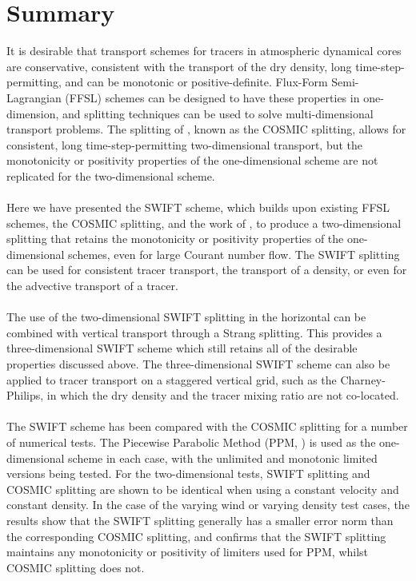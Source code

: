 \documentclass[11pt,a4paper]{article}
\begin{document}
\section{Summary}

It is desirable that transport schemes for tracers in atmospheric dynamical cores are conservative, consistent with the transport of the dry density, long time-step-permitting, and can be monotonic or positive-definite.
Flux-Form Semi-Lagrangian (FFSL) schemes can be designed to have these properties in one-dimension, and splitting techniques can be used to solve multi-dimensional transport problems.
The splitting of \cite{lin1996ffsl,leonard1996cosmic}, known as the COSMIC splitting, allows for consistent, long time-step-permitting two-dimensional transport, but the monotonicity or positivity properties of the one-dimensional scheme are not replicated for the two-dimensional scheme. \\
\\
Here we have presented the SWIFT scheme, which builds upon existing FFSL schemes, the COSMIC splitting, and the work of \cite{skamarock2006limiters}, to produce a two-dimensional splitting that retains the monotonicity or positivity properties of the one-dimensional schemes, even for large Courant number flow. The SWIFT splitting can be used for consistent tracer transport, the transport of a density, or even for the advective transport of a tracer.\\
\\
The use of the two-dimensional SWIFT splitting in the horizontal can be combined with vertical transport through a Strang splitting.
This provides a three-dimensional SWIFT scheme which still retains all of the desirable properties discussed above.
The three-dimensional SWIFT scheme can also be applied to tracer transport on a staggered vertical grid, such as the Charney-Philips, in which the dry density and the tracer mixing ratio are not co-located. \\
\\
The SWIFT scheme has been compared with the COSMIC splitting for a number of numerical tests.
The Piecewise Parabolic Method (PPM, \cite{colella1984ppm}) is used as the one-dimensional scheme in each case, with the unlimited and monotonic limited versions being tested.
For the two-dimensional tests, SWIFT splitting and COSMIC splitting are shown to be identical when using a constant velocity and constant density. In the case of the varying wind or varying density test cases, the results show that the SWIFT splitting generally has a smaller error norm than the corresponding COSMIC splitting, and confirms that the SWIFT splitting maintains any monotonicity or positivity of limiters used for PPM, whilst COSMIC splitting does not.
\end{document}
